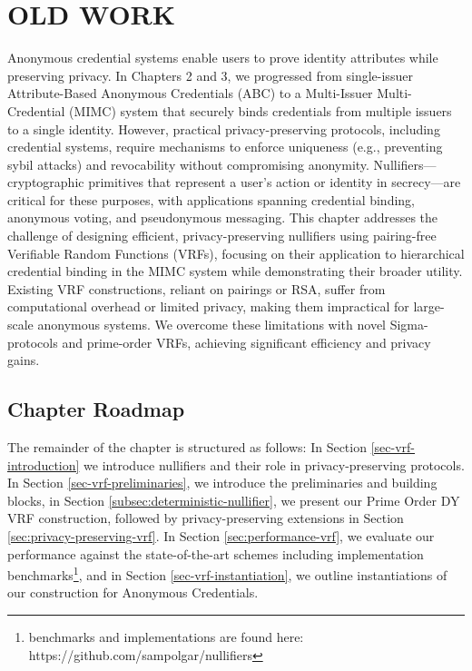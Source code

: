 \newpage
\section{OLD WORK}
Anonymous credential systems enable users to prove identity attributes while preserving privacy. In Chapters 2 and 3, we progressed from single-issuer Attribute-Based Anonymous Credentials (ABC) to a Multi-Issuer Multi-Credential (MIMC) system that securely binds credentials from multiple issuers to a single identity. However, practical privacy-preserving protocols, including credential systems, require mechanisms to enforce uniqueness (e.g., preventing sybil attacks) and revocability without compromising anonymity. Nullifiers—cryptographic primitives that represent a user’s action or identity in secrecy—are critical for these purposes, with applications spanning credential binding, anonymous voting, and pseudonymous messaging. This chapter addresses the challenge of designing efficient, privacy-preserving nullifiers using pairing-free Verifiable Random Functions (VRFs), focusing on their application to hierarchical credential binding in the MIMC system while demonstrating their broader utility. Existing VRF constructions, reliant on pairings or RSA, suffer from computational overhead or limited privacy, making them impractical for large-scale anonymous systems. We overcome these limitations with novel Sigma-protocols and prime-order VRFs, achieving significant efficiency and privacy gains.

\subsection*{Chapter Roadmap}
The remainder of the chapter is structured as follows: In Section \ref{sec-vrf-introduction} we introduce nullifiers and their role in privacy-preserving protocols. In Section \ref{sec-vrf-preliminaries}, we introduce the preliminaries and building blocks, in Section \ref{subsec:deterministic-nullifier}, we present our Prime Order DY VRF construction, followed by privacy-preserving extensions in Section \ref{sec:privacy-preserving-vrf}. In Section \ref{sec:performance-vrf}, we evaluate our performance against the state-of-the-art schemes including implementation benchmarks\footnote{benchmarks and implementations are found here: https://github.com/sampolgar/nullifiers}, and in Section \ref{sec-vrf-instantiation}, we outline instantiations of our construction for Anonymous Credentials. 

